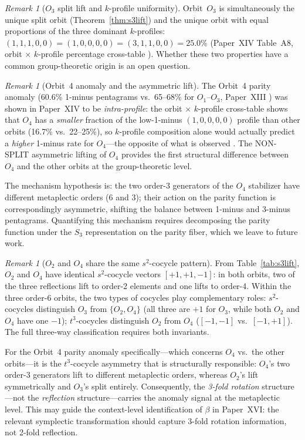 \documentclass[11pt,a4paper]{article}
\theoremstyle{remark}
\newtheorem{remark}[theorem]{Remark}
\begin{document}
\begin{remark}[$O_3$ split lift and $k$-profile uniformity]
Orbit~$O_3$ is simultaneously the unique split orbit (Theorem~\ref{thm:s3lift})
and the unique orbit with equal proportions of the three dominant $k$-profiles:
$(1,1,1,0,0) = (1,0,0,0,0) = (3,1,1,0,0) = 25.0\%$
(Paper~XIV Table~A8, orbit $\times$ $k$-profile percentage cross-table
\cite{PaperXIVsuppl}).
Whether these two properties have a common group-theoretic origin is an open
question.
\end{remark}

\begin{remark}[Orbit~4 anomaly and the asymmetric lift]
\label{rem:orbit4asym}
The Orbit~4 parity anomaly (60.6\% 1-minus pentagrams vs.\ 65--68\% for $O_1$--$O_3$,
Paper~XIII \cite{PaperXIII}) was shown in Paper~XIV to be \emph{intra-profile}:
the orbit $\times$ $k$-profile cross-table shows that $O_4$ has a
\emph{smaller} fraction of the low-1-minus $(1,0,0,0,0)$ profile than other orbits
(16.7\% vs.\ 22--25\%), so $k$-profile composition alone would actually predict a
\emph{higher} 1-minus rate for $O_4$---the opposite of what is observed
\cite{PaperXIV,PaperXIVsuppl}.
The NON-SPLIT asymmetric lifting of $O_4$ provides the first structural
difference between $O_4$ and the other orbits at the group-theoretic level.

The mechanism hypothesis is:
the two order-3 generators of the $O_4$ stabilizer have different metaplectic
orders (6 and 3); their action on the parity function is correspondingly
asymmetric, shifting the balance between 1-minus and 3-minus pentagrams.
Quantifying this mechanism requires decomposing the parity function under the
$S_3$ representation on the parity fiber, which we leave to future work.
\end{remark}

\begin{remark}[$O_2$ and $O_4$ share the same $s^2$-cocycle pattern]
\label{rem:s2same}
From Table~\ref{tab:s3lift}, $O_2$ and $O_4$ have identical $s^2$-cocycle
vectors $[+1,+1,-1]$: in both orbits, two of the three reflections lift to
order-2 elements and one lifts to order-4.
Within the three order-6 orbits, the two types of cocycles play complementary roles:
$s^2$-cocycles distinguish $O_3$ from $\{O_2, O_4\}$ (all three are $+1$ for
$O_3$, while both $O_2$ and $O_4$ have one $-1$);
$t^3$-cocycles distinguish $O_2$ from $O_4$ ($[-1,-1]$ vs.\ $[-1,+1]$).
The full three-way classification requires both invariants.

For the Orbit~4 parity anomaly specifically---which concerns $O_4$ vs.\ the
other orbits---it is the $t^3$-cocycle asymmetry that is structurally responsible:
$O_4$'s two order-3 generators lift to different metaplectic orders, whereas
$O_2$'s lift symmetrically and $O_3$'s split entirely.
Consequently, the \emph{3-fold rotation} structure---not the
\emph{reflection} structure---carries the anomaly signal at the metaplectic level.
This may guide the context-level identification of $\beta$ in Paper~XVI:
the relevant symplectic transformation should capture 3-fold rotation
information, not 2-fold reflection.
\end{remark}
\end{document}
